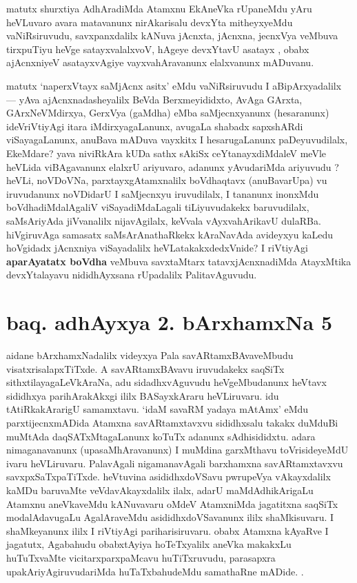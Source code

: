 \begin{artha}
matutx shurxtiya AdhAradiMda Atamxnu EkAneVka rUpaneMdu yAru heVLuvaro avara 
matavanunx nirAkarisalu devxYta mitheyxyeMdu vaNiRsiruvudu, savxpanxdalilx 
kANuva jAcnxta, jAcnxna, jecnxVya veMbuva tirxpuTiyu heVge satayxvalalxvoV, 
hAgeye devxYtavU asatayx , obabx ajAcnxniyeV asatayxvAgiye  vayxvahAravanunx 
elalxvanunx mADuvanu. 

matutx `naperxVtayx saMjAcnx asitx' eMdu vaNiRsiruvudu I aBipArxyadalilx {\rm  {\rm ---} }  yAva ajAcnxnadasheyalilx 
BeVda Berxmeyididxto, AvAga GArxta, GArxNeVMdirxya, GerxVya (gaMdha) eMba 
saMjecnxyanunx (hesaranunx) ideVriVtiyAgi itara iMdirxyagaLanunx, avugaLa 
shabadx sapxshARdi viSayagaLanunx, anuBava mADuva vayxkitx I hesarugaLanunx paDeyuvu\-dilalx,
EkeMdare? yava niviRkAra kUDa sathx sAkiSx ceYtanayxdiMdaleV meVle heVLida viBAgavanunx 
elalxrU ariyuvaro, adanunx yAvudariMda ariyuvudu ? heVLi, noVDoVNa, parxtayxgAtamxnalilx 
boVdhaqtavx (anuBavarUpa) vu iruvudanunx  noVDidarU I saMjecnxyu iruvudilalx, I tananunx 
inonxMdu boVdhadiMdalAgaliV viSayadiMdaLagali tiLiyuvudakekx baruvudilalx, saMsAriyAda 
jiVvanalilx nijavAgilalx, keVvala vAyxvahArikavU dulaRBa. hiVgiruvAga samasatx 
saMsArAnathaRkekx kAraNavAda avideyxyu kaLedu hoVgidadx jAcnxniya viSayadalilx 
heVLatakakxdedxVnide? I riVtiyAgi \textbf{aparAyatatx boVdha} veMbuva savxtaMtarx 
tatavxjAcnxnadiMda AtayxMtika devxYtalayavu nididhAyxsana rUpadalilx PalitavAguvudu.
\end{artha}

\section*{baq. adhAyxya 2. bArxhamxNa 5}

\begin{center}
\end{center}

\begin{artha}
aidane bArxhamxNadalilx videyxya Pala savARtamxBAvaveMbudu visatxrisalapxTiTxde. A savARtamxBAvavu iruvudakekx saqSiTx sithxtilayagaLeVkAraNa, adu sidadhxvAguvudu heVgeMbudanunx heVtavx sididhxya parihArakAkxgi ililx BASayxkAraru heVLiruvaru. idu tAtiRkakArarigU samamxtavu. `idaM savaRM yadaya mAtAmx' eMdu parxtijecnxmADida Atamxna savARtamxtavxvu sididhxsalu takakx duMduBi muMtAda daqSATxMtagaLanunx koTuTx adanunx sAdhisididxtu. adara nimaganavanunx (upasaMhAravanunx) I muMdina garxMthavu toVrisideyeMdU ivaru heVLiruvaru. PalavAgali nigamanavAgali barxhamxna savARtamxtavxvu savxpxSaTxpaTiTxde. heVtuvina asididhxdoVSavu pwrupeVya vAkayxdalilx kaMDu baruvaMte veVdavAkayxdalilx ilalx, adarU maMdAdhikArigaLu Atamxnu aneVkaveMdu kANuvavaru oMdeV AtamxniMda jagatitxna saqSiTx modalAdavugaLu AgalAraveMdu asididhxdoVSavanunx ililx shaMkisuvaru. I shaMkeyanunx ililx I riVtiyAgi pariharisiruvaru. obabx Atamxna kAyaRve I jagatutx, Agabahudu obabxtAyiya hoTeTxyalilx aneVka makakxLu huTuTxvaMte vicitarxparxpaMcavu huTiTxruvudu, parasapxra upakAriyAgiruvudariMda huTaTxbahudeMdu samathaRne mADide. .
\end{artha}

